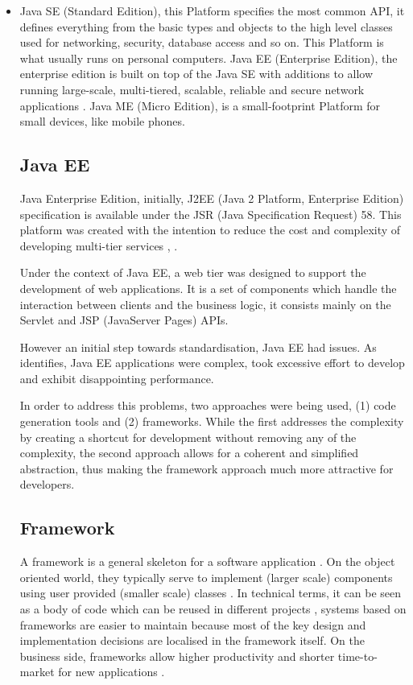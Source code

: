 \begin{itemize}
    \item 
Java SE (Standard Edition), this Platform specifies the most common API, it defines everything from the basic types and objects to the high level classes used for networking, security, database access and so on. This Platform is what usually runs on personal computers.
Java EE (Enterprise Edition), the enterprise edition is built on top of the Java SE with additions to allow running large-scale, multi-tiered, scalable, reliable and secure network applications \cite{firstcup}.
Java ME (Micro Edition), is a small-footprint Platform for small devices, like mobile phones.

\subsection{Java EE}

Java Enterprise Edition, initially, J2EE (Java 2 Platform, Enterprise Edition) specification is available under the JSR (Java Specification Request) 58. This platform was created with the intention to reduce the cost and complexity of developing multi-tier services \cite{jsr58}, \cite{javaEEDeveloperGuide}. 

Under the context of Java EE, a web tier was designed to support the development of web applications. It is a set of components which handle the interaction between clients and the business logic, it consists mainly on the Servlet and JSP (JavaServer Pages) APIs\cite{jsrServletAPI}.

However an initial step towards standardisation, Java EE had issues. As \cite{javaDevelopmentWithSpring} identifies, Java EE applications were complex, took excessive effort to develop and exhibit disappointing performance.

In order to address this problems, two approaches were being used, (1) code generation tools and (2) frameworks. While the first addresses the complexity by creating a shortcut for development without removing any of the complexity, the second approach allows for a coherent and simplified abstraction, thus making the framework approach much more attractive for developers.

\subsection{Framework}

A framework is a general skeleton for a software application \cite{smaltalk}. On the object oriented world, they typically serve to implement (larger scale) components using user provided (smaller scale) classes \cite{thesis}. In technical terms, it can be seen as a body of code which can be reused in different projects \cite{smaltalk}, systems based on frameworks are easier to maintain because most of the key design and implementation decisions are localised in the framework itself.  On the business side, frameworks allow higher productivity and shorter time-to-market for new applications \cite{thesis}.


\end{itemize}
